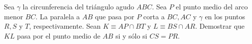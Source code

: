 Sea $\gamma$ la circunferencia del triángulo agudo $ABC$. Sea $P$ el punto medio del arco menor $BC$. La paralela a $AB$ que pasa por $P$ corta a $BC, AC$ y $\gamma$ en los puntos $R,S$ y $T$, respectivamente. Sean $K \equiv AP \cap BT$ y $L \equiv BS \cap AR$.  Demostrar que $KL$ pasa por el punto medio de $AB$ si y sólo si $CS = PR$.

